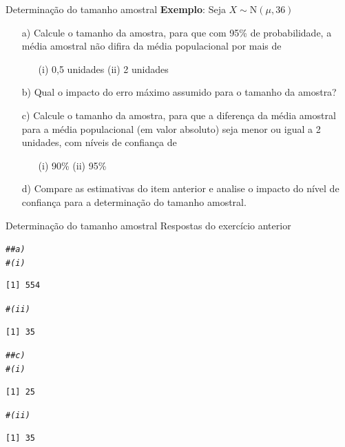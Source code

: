\documentclass[10pt]{beamer}\usepackage[]{graphicx}\usepackage[]{color}
\makeatletter
\newcommand{\hlcom}[1]{\textcolor[rgb]{0.678,0.584,0.686}{\textit{#1}}}%
\newenvironment{kframe}{%
 \def\at@end@of@kframe{}%
 \ifinner\ifhmode%
  \def\at@end@of@kframe{\end{minipage}}%
  \begin{minipage}{\columnwidth}%
 \fi\fi%
 \def\FrameCommand##1{\hskip\@totalleftmargin \hskip-\fboxsep
 \colorbox{shadecolor}{##1}\hskip-\fboxsep
     \hskip-\linewidth \hskip-\@totalleftmargin \hskip\columnwidth}%
 \MakeFramed {\advance\hsize-\width
   \@totalleftmargin\z@ \linewidth\hsize
   \@setminipage}}%
 {\par\unskip\endMakeFramed%
 \at@end@of@kframe}
\newenvironment{knitrout}{}{} %
\theoremstyle{definition}
\makeatother
\begin{document}
\begin{frame}{Determinação do tamanho amostral}
  \textbf{Exemplo}: Seja $X \sim \text{N}(\mu,36)$
  \begin{itemize}
  \item[a)] Calcule o tamanho da amostra, para que com 95\% de
    probabilidade, a média amostral não difira da média populacional por
    mais de
    \begin{itemize}
    \item[] (i) 0,5 unidades \quad (ii) 2 unidades
    \end{itemize}
  \item[b)] Qual o impacto do erro máximo assumido para o tamanho da
    amostra?
  \item[c)] Calcule o tamanho da amostra, para que a diferença da média
    amostral para a média populacional (em valor absoluto) seja menor ou
    igual a 2 unidades, com níveis de confiança de
    \begin{itemize}
    \item[] (i) 90\% \quad (ii) 95\%
    \end{itemize}
  \item[d)] Compare as estimativas do item anterior e analise o impacto
    do nível de confiança para a determinação do tamanho amostral.
  \end{itemize}
\end{frame}

\begin{frame}[fragile]{Determinação do tamanho amostral}
Respostas do exercício anterior
\begin{knitrout}\footnotesize
{}\color{fgcolor}\begin{kframe}
\begin{alltt}
\hlcom{## a)}
\hlcom{# (i)}
\end{alltt}
\begin{verbatim}
[1] 554
\end{verbatim}
\begin{alltt}
\hlcom{# (ii)}
\end{alltt}
\begin{verbatim}
[1] 35
\end{verbatim}
\begin{alltt}
\hlcom{## c)}
\hlcom{# (i)}
\end{alltt}
\begin{verbatim}
[1] 25
\end{verbatim}
\begin{alltt}
\hlcom{# (ii)}
\end{alltt}
\begin{verbatim}
[1] 35
\end{verbatim}
\end{kframe}
\end{knitrout}
\end{frame}
\end{document}
